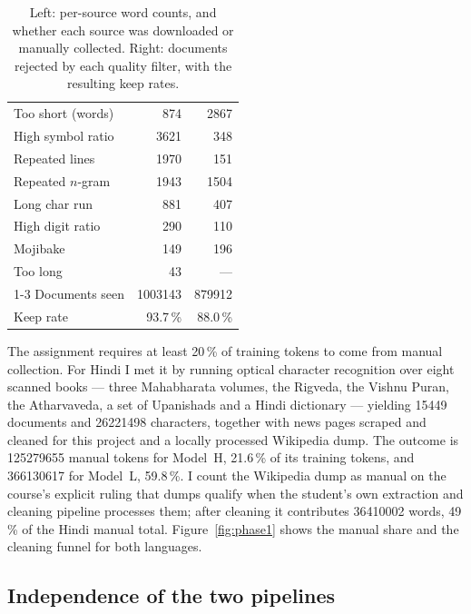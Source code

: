 \documentclass[10pt,a4paper]{article}
\newcommand{\pc}[1]{#1\,\%}
\begin{document}
\begin{table}[htbp]
\begin{minipage}[b]{0.41\linewidth}
\begin{tabular}{@{}l r r@{}}
Too short (words)    & \num{874}   & \num{2867} \\
High symbol ratio    & \num{3621}  & \num{348} \\
Repeated lines       & \num{1970}  & \num{151} \\
Repeated $n$-gram    & \num{1943}  & \num{1504} \\
Long char run        & \num{881}   & \num{407} \\
High digit ratio     & \num{290}   & \num{110} \\
Mojibake             & \num{149}   & \num{196} \\
Too long             & \num{43}    & --- \\
\cmidrule(r){1-3}
Documents seen       & \num{1003143} & \num{879912} \\
Keep rate            & \pc{93.7}   & \pc{88.0} \\
\bottomrule
\end{tabular}
\end{minipage}

\caption{Left: per-source word counts, and whether each source was downloaded or manually collected. Right: documents rejected by each quality filter, with the resulting keep rates.}
\label{tab:sources}
\end{table}

The assignment requires at least \pc{20} of training tokens to come from manual
collection. For Hindi I met it by running optical character recognition over eight scanned
books --- three Mahabharata volumes, the Rigveda, the Vishnu Puran, the
Atharvaveda, a set of Upanishads and a Hindi dictionary --- yielding
\num{15449} documents and \num{26221498} characters, together with news pages
scraped and cleaned for this project and a locally processed Wikipedia dump. The
outcome is \num{125279655} manual tokens for Model~H, \pc{21.6} of its training
tokens, and \num{366130617} for Model~L, \pc{59.8}. I count the Wikipedia dump as
manual on the course's explicit ruling that dumps qualify when the student's
own extraction and cleaning pipeline processes them; after cleaning it
contributes \num{36410002} words, \pc{49} of the Hindi manual total.
Figure~\ref{fig:phase1} shows the manual share and the cleaning funnel for both
languages.

\subsection{Independence of the two pipelines}\label{sec:indep}
\end{document}
